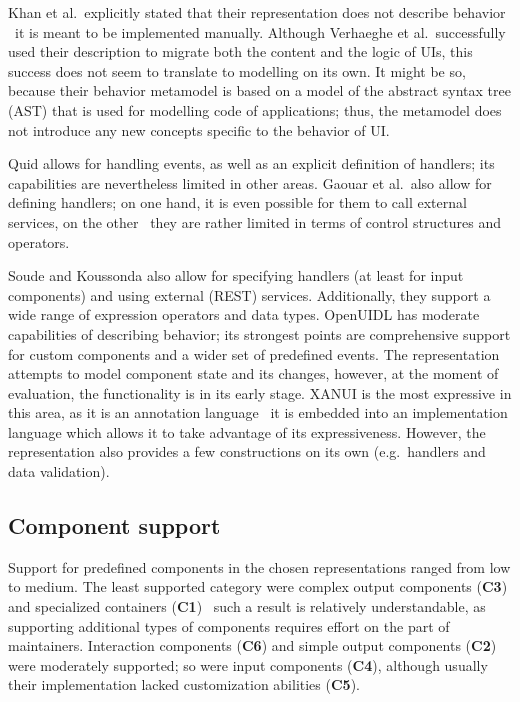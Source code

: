 Khan et al.\ explicitly stated that their representation does not describe behavior \textendash\ it is meant to be implemented manually.
Although Verhaeghe et al.\ successfully used their description to migrate both the content and the logic of UIs, this success does not seem to translate to modelling on its own.
It might be so, because their behavior metamodel is based on a model of the abstract syntax tree (AST) that is used for modelling code of applications;
thus, the metamodel does not introduce any new concepts specific to the behavior of UI\@.

Quid allows for handling events, as well as an explicit definition of handlers; its capabilities are nevertheless limited in other areas.
Gaouar et al.\ also allow for defining handlers; on one hand, it is even possible for them to call external services, on the other \textendash\ they are rather limited in terms of control structures and operators.

Soude and Koussonda also allow for specifying handlers (at least for input components) and using external (REST) services.
Additionally, they support a wide range of expression operators and data types.
OpenUIDL has moderate capabilities of describing behavior;
its strongest points are comprehensive support for custom components and a wider set of predefined events.
The representation attempts to model component state and its changes, however, at the moment of evaluation, the functionality is in its early stage.
XANUI is the most expressive in this area, as it is an annotation language \textendash\ it is embedded into an implementation language which allows it to take advantage of its expressiveness.
However, the representation also provides a few constructions on its own (e.g.\ handlers and data validation).

\subsection{Component support}\label{subsec:4-2-component-support}
Support for predefined components in the chosen representations ranged from low to medium.
The least supported category were complex output components (\textbf{C3}) and specialized containers (\textbf{C1}) \textendash\ such a result is relatively understandable, as supporting additional types of components requires effort on the part of maintainers.
Interaction components (\textbf{C6}) and simple output components (\textbf{C2}) were moderately supported;
so were input components (\textbf{C4}), although usually their implementation lacked customization abilities (\textbf{C5}).

